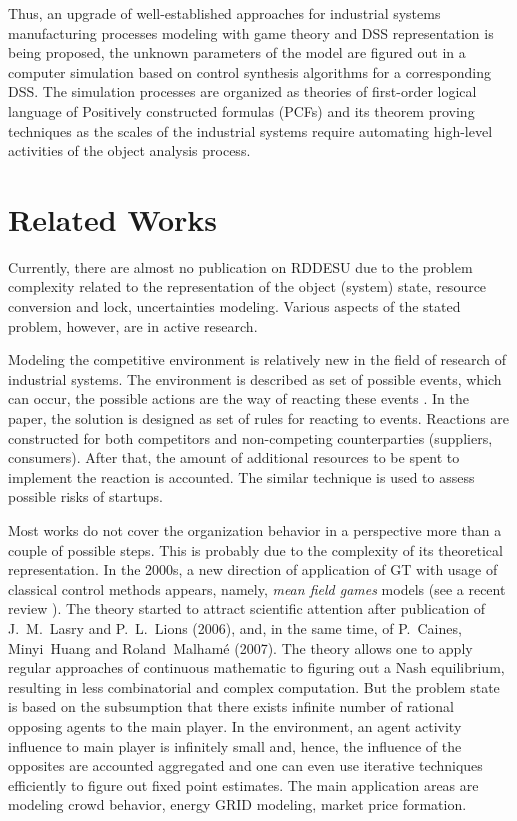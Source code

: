 \documentclass[conference]{IEEEtran}
\begin{document}
Thus, an upgrade of well-established approaches for industrial systems manufacturing processes modeling with game theory and DSS representation is being proposed, the unknown parameters of the model are figured out in a computer simulation based on control synthesis algorithms for a corresponding DSS.  The simulation processes are organized as theories of first-order logical language of Positively constructed formulas (PCFs) and its theorem proving techniques as the scales of the industrial systems require automating high-level activities of the object analysis process.

\section{Related Works}
\label{sec:rel-works}

Currently, there are almost no publication on RDDESU due to the problem complexity related to the representation of the object (system) state, resource conversion and lock, uncertainties modeling.  Various aspects of the stated problem, however, are in active research.

Modeling the competitive environment is relatively new in the field of research of industrial systems. The environment is described as set of possible events, which can occur, the possible actions are the way of reacting these events \cite{andres,ahmed}. In the paper, the solution is designed as set of rules for reacting to events. Reactions are constructed for both competitors and non-competing counterparties (suppliers, consumers).  After that, the amount of additional resources to be spent to implement the reaction is accounted.  The similar technique is used to assess possible risks of startups.

Most works do not cover the organization behavior in a perspective more than a couple of possible steps. This is probably due to the complexity of its theoretical representation. In the 2000s, a new direction of application of GT with usage of classical control methods appears, namely, \emph{mean field games} models (see a recent review \cite{gomes}). The theory started to attract scientific attention after publication of J.~M.~Lasry and P.~L.~Lions (2006), and, in the same time, of P.~Caines, Minyi~Huang and Roland~Malhamé (2007). The theory allows one to apply regular approaches of continuous mathematic to figuring out a Nash equilibrium, resulting in less combinatorial and complex computation. But the problem state is based on the subsumption that there exists infinite number of rational opposing agents to the main player. In the environment, an agent activity influence to main player is infinitely small and, hence, the influence of the opposites are accounted aggregated and one can even use iterative techniques efficiently to figure out fixed point estimates. The main application areas are modeling crowd behavior, energy GRID modeling, market price formation.
\end{document}
